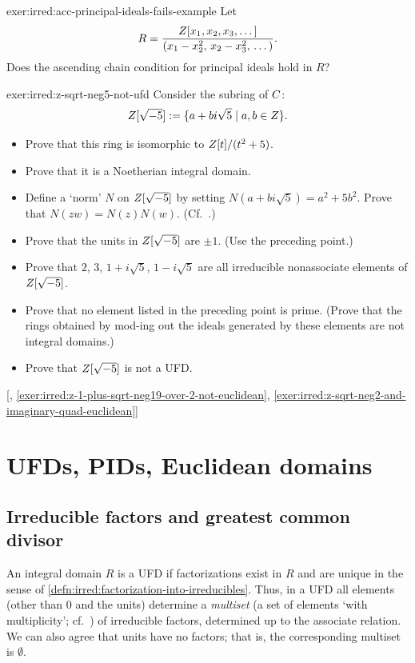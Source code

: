 \begin{exer}{}{exer:irred:acc-principal-ideals-fails-example}
  Let
  \[R = \frac{Z[x_1, x_2, x_3, \dots]}{(x_1 - x_2^2,\, x_2 - x_3^2,\,
      \dots)}.\] Does the ascending chain condition for principal
  ideals hold in $R$?
\end{exer}

\begin{exer}{\exerused}{exer:irred:z-sqrt-neg5-not-ufd}
  Consider the subring of $C$:
  \[Z[\sqrt{-5}] := \{a + bi\sqrt{5} \mid a, b \in Z\}.\]
  \begin{itemize}
  \item Prove that this ring is isomorphic to $Z[t]/(t^2 + 5)$.
  \item Prove that it is a Noetherian integral domain.
  \item Define a `norm' $N$ on $Z[\sqrt{-5}]$ by setting
    $N(a + bi\sqrt{5}) = a^2 + 5b^2$. Prove that $N(zw) = N(z)N(w)$.
    (Cf.\ .)
  \item Prove that the units in $Z[\sqrt{-5}]$ are $\pm 1$. (Use the
    preceding point.)
  \item Prove that $2$, $3$, $1 + i\sqrt{5}$, $1 - i\sqrt{5}$ are all
    irreducible nonassociate elements of $Z[\sqrt{-5}]$.
  \item Prove that no element listed in the preceding point is
    prime. (Prove that the rings obtained by mod-ing out the ideals
    generated by these elements are not integral domains.)
  \item Prove that $Z[\sqrt{-5}]$ is not a UFD.
  \end{itemize} [,
  \ref{exer:irred:z-1-plus-sqrt-neg19-over-2-not-euclidean},
  \ref{exer:irred:z-sqrt-neg2-and-imaginary-quad-euclidean}]
\end{exer}

\section{UFDs, PIDs, Euclidean domains}
\label{sec:irred:ufds-pids-euclidean-domains}


\subsection{Irreducible factors and greatest common divisor}
\label{subsec:irred:irreducible-factors-and-greatest-common-divisor}
An integral domain $R$ is a UFD if factorizations exist in $R$ and are
unique in the sense of \cref{defn:irred:factorization-into-irreducibles}. Thus, in a UFD all
elements (other than $0$ and the units) determine a \emph{multiset} (a
set of elements `with multiplicity';
cf.~) of irreducible factors, determined
up to the associate relation. We can also agree that units have no
factors; that is, the corresponding multiset is $\emptyset$.

